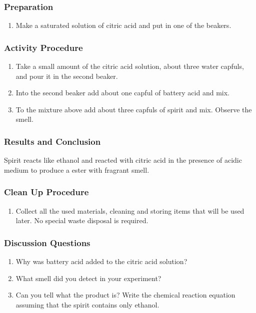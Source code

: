 \subsubsection*{Preparation}
\begin{enumerate}
\item{Make a saturated solution of citric acid and put in one of the beakers.}
\end{enumerate}

\subsubsection*{Activity Procedure}
\begin{enumerate}
\item{Take a small amount of the citric acid solution, about three water capfuls, and pour it in the second beaker.}
\item{Into the second beaker add about one capful of battery acid and mix.}
\item{To the mixture above add about three capfuls of spirit and mix. Observe the smell.}
\end{enumerate}

\subsubsection*{Results and Conclusion}
Spirit reacts like ethanol and reacted with citric acid in the presence of acidic medium to produce a ester with fragrant smell.

\subsubsection*{Clean Up Procedure}
\begin{enumerate}
\item{Collect all the used materials, cleaning and storing items that will be used later. No special waste disposal is required.}
\end{enumerate}

\subsubsection*{Discussion Questions}
\begin{enumerate}
\item{Why was battery acid added to the citric acid solution?}
\item{What smell did you detect in your experiment?}
\item{Can you tell what the product is? Write the chemical reaction equation assuming that the spirit contains only ethanol.}
\end{enumerate}

